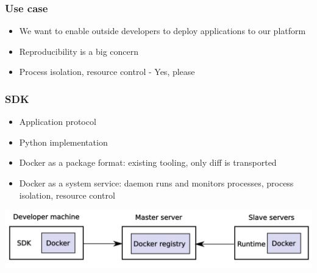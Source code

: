 \documentclass{beamer}
\begin{document}
  \begin{frame}
    \frametitle{Use case}
    \begin{itemize}
    	\item We want to enable outside developers to deploy applications to our platform
    	\item Reproducibility is a big concern
    	\item Process isolation, resource control - Yes, please
    \end{itemize}
  \end{frame}
  
  \begin{frame}
  	\frametitle{SDK}
  	\begin{itemize}
    	\item Application protocol
    	\item Python implementation
    	\item Docker as a package format: existing tooling, only diff is transported
    	\item Docker as a system service: daemon runs and monitors processes, process isolation, resource control
    \end{itemize}
    
    \includegraphics[scale=0.33]{arch.png}
  \end{frame}

  
\end{document}
